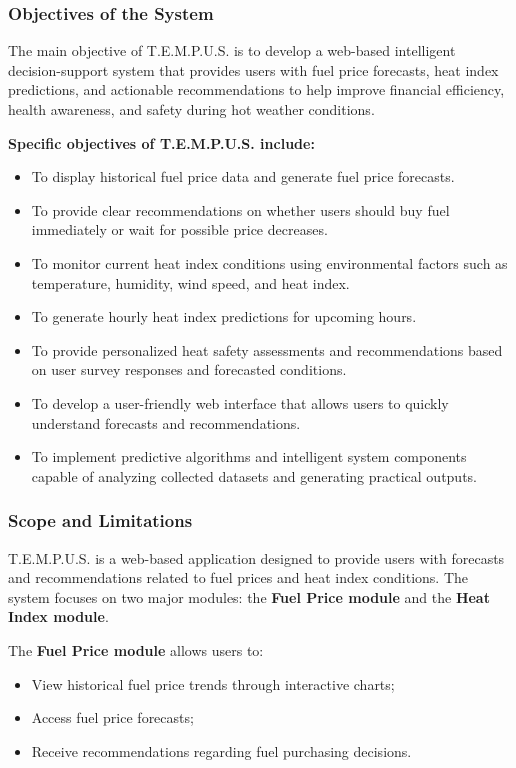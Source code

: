 \documentclass[12pt]{article}
\begin{document}
\subsubsection{Objectives of the System}

The main objective of T.E.M.P.U.S. is to develop a web-based intelligent decision-support system that provides users with fuel price forecasts, heat index predictions, and actionable recommendations to help improve financial efficiency, health awareness, and safety during hot weather conditions.

\noindent\textbf{Specific objectives of T.E.M.P.U.S. include:}
\begin{itemize}
    \item To display historical fuel price data and generate fuel price forecasts.
    \item To provide clear recommendations on whether users should buy fuel immediately or wait for possible price decreases.
    \item To monitor current heat index conditions using environmental factors such as temperature, humidity, wind speed, and heat index.
    \item To generate hourly heat index predictions for upcoming hours.
    \item To provide personalized heat safety assessments and recommendations based on user survey responses and forecasted conditions.
    \item To develop a user-friendly web interface that allows users to quickly understand forecasts and recommendations.
    \item To implement predictive algorithms and intelligent system components capable of analyzing collected datasets and generating practical outputs.
\end{itemize}

\subsubsection{Scope and Limitations}

T.E.M.P.U.S. is a web-based application designed to provide users with forecasts and recommendations related to fuel prices and heat index conditions. The system focuses on two major modules: the \textbf{Fuel Price module} and the \textbf{Heat Index module}.

\medskip
\noindent The \textbf{Fuel Price module} allows users to:
\begin{itemize}
    \item View historical fuel price trends through interactive charts;
    \item Access fuel price forecasts;
    \item Receive recommendations regarding fuel purchasing decisions.
\end{itemize}
\end{document}

